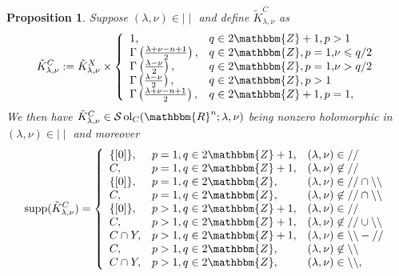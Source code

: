 \documentclass{article}
\newcommand{\assign}{:=}
\newcommand{\comma}{{,}}
\newcommand{\nin}{\not\in}
\newcommand{\tmop}[1]{\ensuremath{\operatorname{#1}}}
\newtheorem{proposition}{Proposition}[section]
\theoremstyle{remark}
\begin{document}
\begin{proposition}
  \label{supp-sing:prop-supp-C}Suppose $(\lambda, \nu) \in \mid \mid$ and
  define $\tilde{K}_{\lambda, \nu}^C$ as
  \[ \tilde{K}^C_{\lambda, \nu} \assign \tilde{K}_{\lambda, \nu}^X \times
     \left\{ \begin{array}{ll}
       1, & q \in 2\mathbbm{Z}+ 1, p > 1\\
       \Gamma^{} \left( \frac{\lambda + \nu - n + 1}{2} \right), & q \in
       2\mathbbm{Z}, p = 1 \comma \nu \leqslant q / 2\\
       \Gamma^{} \left( \frac{\lambda - \nu}{2} \right), & q \in 2\mathbbm{Z},
       p = 1 \comma \nu > q / 2\\
       \Gamma \left( \frac{\lambda - \nu}{2} \right), & q \in 2\mathbbm{Z}, p
       > 1\\
       \Gamma \left( \frac{\lambda + \nu - n + 1}{2} \right), & q \in
       2\mathbbm{Z}+ 1, p = 1,
     \end{array} \right. \]
  We then have $\tilde{K}^C_{\lambda, \nu} \in \mathcal{S} \tmop{ol}_C
  (\mathbbm{R}^n ; \lambda, \nu)$ being nonzero holomorphic in $ (\lambda,
  \nu) \in \mid \mid$ and moreover
  \[ \tmop{supp} (\tilde{K}_{\lambda, \nu}^C) = \left\{ \begin{array}{lll}
       \{ [0] \}, & p = 1, q \in 2\mathbbm{Z}+ 1, & (\lambda, \nu) \in / /\\
       C, & p = 1, q \in 2\mathbbm{Z}+ 1, & (\lambda, \nu) \nin / /\\
       \{ [0] \}, & p = 1, q \in 2\mathbbm{Z}, & (\lambda, \nu) \in / / \cap
       \backslash\backslash\\
       C, & p = 1, q \in 2\mathbbm{Z}, & (\lambda, \nu) \nin / / \cap
       \backslash\backslash\\
       \{ [0] \}, & p > 1, q \in 2\mathbbm{Z}+ 1, & (\lambda, \nu) \in / /\\
       C, & p > 1, q \in 2\mathbbm{Z} + 1, & (\lambda, \nu) \nin / / \cup
       \backslash\backslash\\
       C \cap Y, & p > 1, q \in 2\mathbbm{Z} + 1, & (\lambda, \nu) \in
       \backslash\backslash - / /\\
       C, & p > 1, q \in 2\mathbbm{Z}, & (\lambda, \nu) \nin
       \backslash\backslash\\
       C \cap Y, & p > 1, q \in 2\mathbbm{Z}, & (\lambda, \nu) \in
       \backslash\backslash,
     \end{array} \right. \]
\end{proposition}
\end{document}
